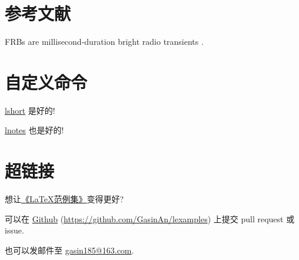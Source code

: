 \documentclass{ctexart}
\begin{document}
    \section{参考文献}
    FRBs are millisecond-duration bright radio transients
    \cite{Li2018,Lin2020}.
    
    
    \section{自定义命令}
    \def\lshortURL{https://www.ctan.org/pkg/lshort}
    \def\lnotesURL{https://github.com/huangxg/lnotes}
    \newcommand{\isgood}[3][是好的]{\href{#3}{#2} #1!}

    \isgood{lshort}{\lshortURL}

    \isgood[也是好的]{lnotes}{\lnotesURL}
    \section{超链接}
    想让\href{clexample.pdf}{《\LaTeX{}范例集》}变得更好?

    可以在 \href{https://github.com/GasinAn/lexamples}{Github}
    (\url{https://github.com/GasinAn/lexamples}) 上提交 pull request 或 issue.

    也可以发邮件至 \href{mailto:gasin185@163.com}{gasin185@163.com}.
\end{document}
